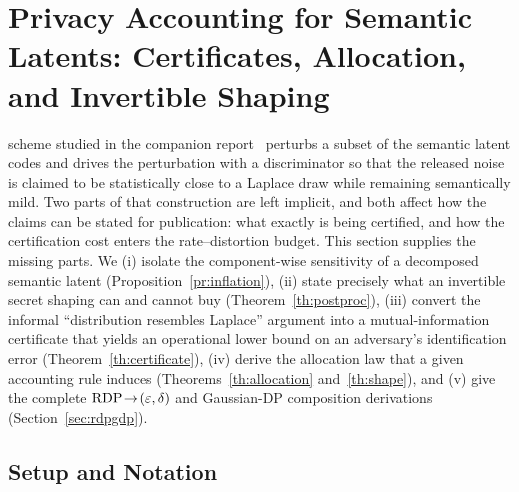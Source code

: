 \theoremstyle{plain}
\newtheorem{theorem}{Theorem}
\newtheorem{proposition}{Proposition}
\newtheorem{lemma}{Lemma}
\newtheorem{corollary}{Corollary}
\theoremstyle{definition}
\newtheorem{assumption}{Assumption}
\newtheorem{remark}{Remark}

\section{Privacy Accounting for Semantic Latents:
         Certificates, Allocation, and Invertible Shaping}
\label{sec:accounting}

 scheme studied in the companion
report~\cite{arXiv2510} perturbs a subset of the semantic latent codes and
drives the perturbation with a discriminator so that the released noise is
claimed to be statistically close to a Laplace draw while remaining
semantically mild. Two
parts of that construction are left implicit, and both affect how the claims
can be stated for publication: what exactly is being certified, and how the
certification cost enters the rate--distortion budget. This section supplies
the missing parts. We (i) isolate the component-wise sensitivity of a
decomposed semantic latent (Proposition~\ref{pr:inflation}), (ii) state
precisely what an invertible secret shaping can and cannot buy
(Theorem~\ref{th:postproc}), (iii) convert the informal ``distribution
resembles Laplace'' argument into a mutual-information certificate that yields
an operational lower bound on an adversary's identification error
(Theorem~\ref{th:certificate}), (iv) derive the allocation law that a given
accounting rule induces (Theorems~\ref{th:allocation}
and~\ref{th:shape}), and (v) give the complete
$\mathrm{RDP}\!\to\!(\varepsilon,\delta)$ and Gaussian-DP composition derivations
(Section~\ref{sec:rdpgdp}).

\subsection{Setup and Notation}
\label{sec:setup}

